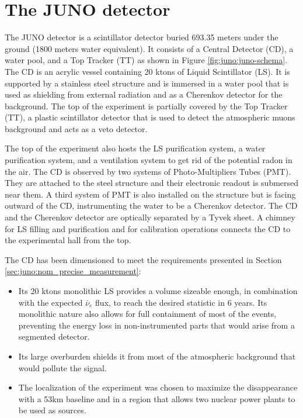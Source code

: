 \documentclass[../main.tex]{subfiles}
\begin{document}
\section{The JUNO detector}
\label{sec:juno:juno_detector}

The JUNO detector is a scintillator detector buried 693.35 meters under the ground (1800 meters water equivalent). It consists of a Central Detector (CD), a water pool, and a Top Tracker (TT) as shown in Figure \ref{fig:juno:juno-schema}.
The CD is an acrylic vessel containing 20 ktons of Liquid Scintillator (LS). It is supported by a stainless steel structure and is immersed in a water pool that is used as shielding from external radiation and as a Cherenkov detector for the background. The top of the experiment is partially covered by the Top Tracker (TT), a plastic scintillator detector that is used to detect the atmospheric muons background and acts as a veto detector.


The top of the experiment also hosts the LS purification system, a water purification system, and a ventilation system to get rid of the potential radon in the air.
The CD is observed by two systems of Photo-Multipliers Tubes (PMT). They are attached to the steel structure and their electronic readout is submersed near them. A third system of PMT is also installed on the structure but is facing outward of the CD, instrumenting the water to be a Cherenkov detector. The CD and the Cherenkov detector are optically separated by a Tyvek sheet. A chimney for LS filling and purification and for calibration operations connects the CD to the experimental hall from the top.

The CD has been dimensioned to meet the requirements presented in Section \ref{sec:juno:nom_precise_measurement}:
\begin{itemize}
  \item Its 20 ktons monolithic LS provides a volume sizeable enough, in combination with the expected $\bar{\nu}_e$ flux, to reach the desired statistic in 6 years. Its monolithic nature also allows for full containment of most of the events, preventing the energy loss in non-instrumented parts that would arise from a segmented detector.
  \item Its large overburden shields it from most of the atmospheric background that would pollute the signal.
  \item The localization of the experiment was chosen to maximize the disappearance with a 53km baseline and in a region that allows two nuclear power plants to be used as sources.
\end{itemize}
\end{document}
